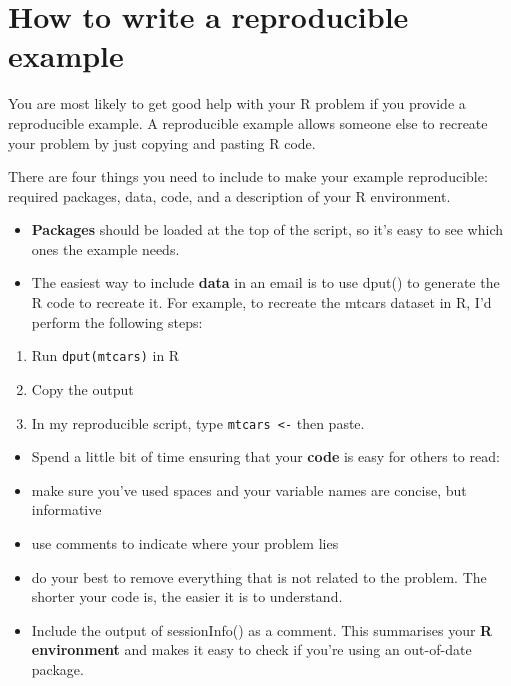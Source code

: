 \chapter{How to write a reproducible example}

You are most likely to get good help with your R problem if you provide
a reproducible example. A reproducible example allows someone else to
recreate your problem by just copying and pasting R code.

There are four things you need to include to make your example
reproducible: required packages, data, code, and a description of your R
environment.

\begin{itemize}
\item
  \textbf{Packages} should be loaded at the top of the script, so it's
  easy to see which ones the example needs.
\item
  The easiest way to include \textbf{data} in an email is to use dput()
  to generate the R code to recreate it. For example, to recreate the
  mtcars dataset in R, I'd perform the following steps:
\end{itemize}

\begin{enumerate}
\def\labelenumi{\arabic{enumi}.}
\itemsep1pt\parskip0pt
\item
  Run \texttt{dput(mtcars)} in R
\item
  Copy the output
\item
  In my reproducible script, type \texttt{mtcars \textless{}-} then
  paste.
\end{enumerate}

\begin{itemize}
\item
  Spend a little bit of time ensuring that your \textbf{code} is easy
  for others to read:
\item
  make sure you've used spaces and your variable names are concise, but
  informative
\item
  use comments to indicate where your problem lies
\item
  do your best to remove everything that is not related to the problem.
  The shorter your code is, the easier it is to understand.
\item
  Include the output of sessionInfo() as a comment. This summarises your
  \textbf{R environment} and makes it easy to check if you're using an
  out-of-date package.
\end{itemize}

